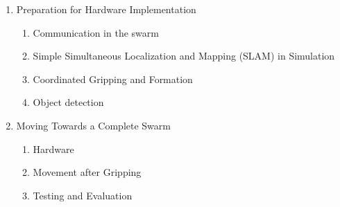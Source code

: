 \begin{enumerate}
    \item Preparation for Hardware Implementation
    \begin{enumerate}[label=1.\arabic*]
        \item Communication in the swarm
        \item Simple Simultaneous Localization and Mapping (SLAM) in Simulation
        \item Coordinated Gripping and Formation
        \item Object detection
    \end{enumerate}
    \item Moving Towards a Complete Swarm
    \begin{enumerate}[label=2.\arabic*]
        \item Hardware
        \item Movement after Gripping
        \item Testing and Evaluation
    \end{enumerate}
\end{enumerate}
